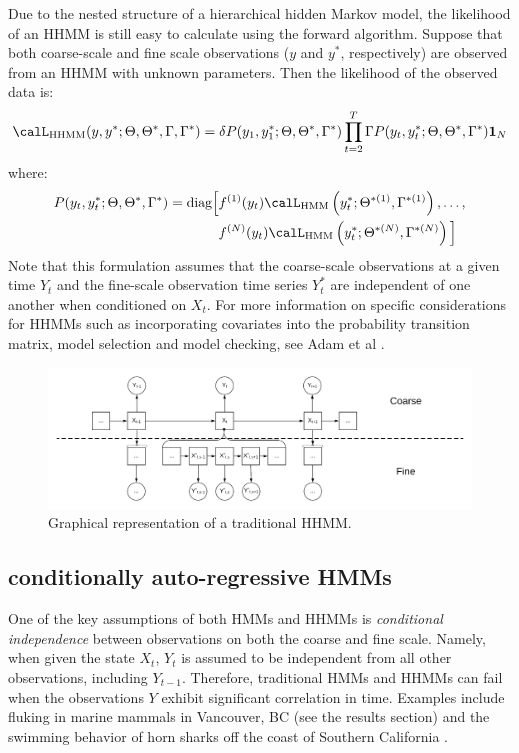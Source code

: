 Due to the nested structure of a hierarchical hidden Markov model, the likelihood of an HHMM is still easy to calculate using the forward algorithm. Suppose that both coarse-scale and fine scale observations ($y$ and $y^*$, respectively) are observed from an HHMM with unknown parameters. Then the likelihood of the observed data is:
%
$$\calL_{\text{HHMM}}(y,y^*;\Theta,\Theta^*,\Gamma,\Gamma^*) = \delta P(y_1,y_1^*;\Theta,\Theta^*,\Gamma^*) \prod_{t=2}^T \Gamma P(y_t,y_t^*;\Theta,\Theta^*,\Gamma^*) \mathbf{1}_N$$
%
where:
%
\begin{align*}
	P(y_t,y_t^*;\Theta,\Theta^*,\Gamma^*) = \text{diag}\Big[&f^{(1)}(y_t)\calL_{\text{HMM}}\left(y_t^*;\Theta^{*(1)},\Gamma^{*(1)}\right),\ldots, \\
	&f^{(N)}(y_t)\calL_{\text{HMM}}\left(y_t^*;\Theta^{*(N)},\Gamma^{*(N)}\right) \Big]
\end{align*}
%
Note that this formulation assumes that the coarse-scale observations at a given time $Y_t$ and the fine-scale observation time series $Y_t^*$ are independent of one another when conditioned on $X_t$. For more information on specific considerations for HHMMs such as incorporating covariates into the probability transition matrix, model selection and model checking, see Adam et al \citep{Adam:2019}.

\begin{figure}[h!]
	\centering
	\includegraphics[width=6.5in]{../Plots/HHMM.png}
	\caption{Graphical representation of a traditional HHMM.}
	\label{fig:HHMM}
\end{figure}


\subsection{conditionally auto-regressive HMMs}

One of the key assumptions of both HMMs and HHMMs is \textit{conditional independence} between observations on both the coarse and fine scale. Namely, when given the state $X_t$, $Y_t$ is assumed to be independent from all other observations, including $Y_{t-1}$. Therefore, traditional HMMs and HHMMs can fail when the observations $Y$ exhibit significant correlation in time. Examples include fluking in marine mammals in Vancouver, BC (see the results section) and the swimming behavior of horn sharks off the coast of Southern California \citep{Adam:2019}.


